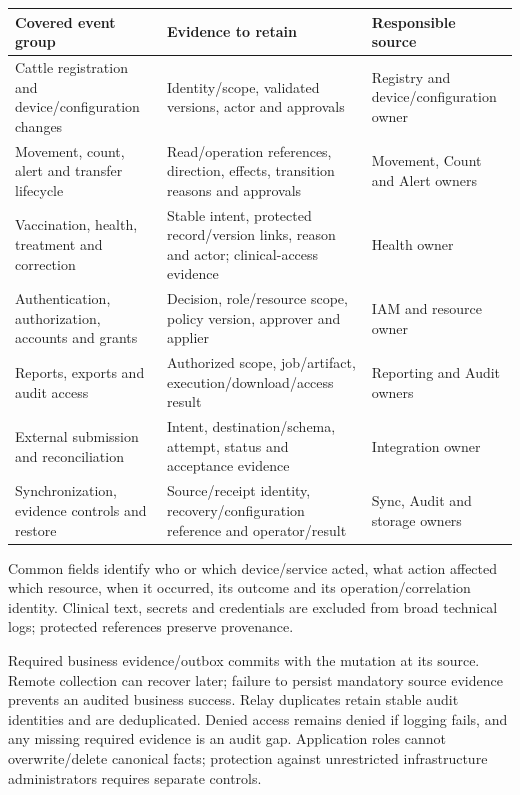 {\small
\begin{longtable}[]{|>{\raggedright\arraybackslash}p{}|>{\raggedright\arraybackslash}p{}|>{\raggedright\arraybackslash}p{}|}
\hline
\textbf{Covered event group} & \textbf{Evidence to retain} & \textbf{Responsible source} \\ \hline
\endhead
Cattle registration and device/configuration changes & Identity/scope,
validated versions, actor and approvals & Registry and
device/configuration owner \\ \hline
Movement, count, alert and transfer lifecycle & Read/operation
references, direction, effects, transition reasons and approvals &
Movement, Count and Alert owners \\ \hline
Vaccination, health, treatment and correction & Stable intent, protected
record/version links, reason and actor; clinical-access evidence &
Health owner \\ \hline
Authentication, authorization, accounts and grants & Decision,
role/resource scope, policy version, approver and applier & IAM and
resource owner \\ \hline
Reports, exports and audit access & Authorized scope, job/artifact,
execution/download/access result & Reporting and Audit owners \\ \hline
External submission and reconciliation & Intent, destination/schema,
attempt, status and acceptance evidence & Integration owner \\ \hline
Synchronization, evidence controls and restore & Source/receipt
identity, recovery/configuration reference and operator/result & Sync,
Audit and storage owners \\ \hline
\end{longtable}
}

Common fields identify who or which device/service acted, what action
affected which resource, when it occurred, its outcome and its
operation/correlation identity. Clinical text, secrets and credentials
are excluded from broad technical logs; protected references preserve
provenance.

Required business evidence/outbox commits with the mutation at its
source. Remote collection can recover later; failure to persist
mandatory source evidence prevents an audited business success. Relay
duplicates retain stable audit identities and are deduplicated.
Denied access remains denied if logging fails, and any missing required
evidence is an audit gap. Application roles cannot overwrite/delete
canonical facts; protection against unrestricted infrastructure
administrators requires separate controls.
